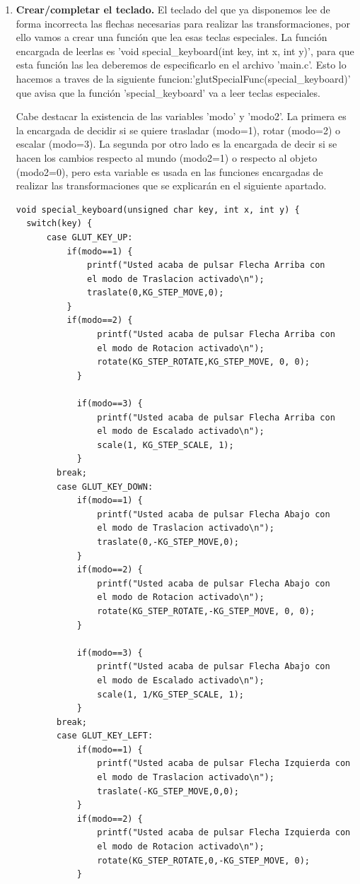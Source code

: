 \documentclass[12pt,a4paper]{article}
\begin{document}
\begin{enumerate}
\item \textbf{Crear/completar el teclado.}\newline
El teclado del que ya disponemos lee de forma incorrecta las flechas necesarias para realizar las transformaciones, por ello vamos a crear una función que lea esas teclas especiales. La función encargada de leerlas es 'void special\_keyboard(int key, int x, int y)', para que esta función las lea deberemos de especificarlo en el archivo 'main.c'. Esto lo hacemos a traves de la siguiente funcion:'glutSpecialFunc(special\_keyboard)' que avisa que la función 'special\_keyboard' va a leer teclas especiales.\newline

Cabe destacar la existencia de las variables 'modo' y 'modo2'. La primera es la encargada de decidir si se quiere trasladar (modo=1), rotar (modo=2) o escalar (modo=3). La segunda por otro lado es la encargada de decir si se hacen los cambios respecto al mundo (modo2=1) o respecto al objeto (modo2=0), pero esta variable es usada en las funciones encargadas de realizar las transformaciones que se explicarán en el siguiente apartado.\newline
\begin{lstlisting}
void special_keyboard(unsigned char key, int x, int y) {
  switch(key) {
      case GLUT_KEY_UP:
          if(modo==1) {
              printf("Usted acaba de pulsar Flecha Arriba con 
              el modo de Traslacion activado\n");
              traslate(0,KG_STEP_MOVE,0);
          }
          if(modo==2) {
                printf("Usted acaba de pulsar Flecha Arriba con 
                el modo de Rotacion activado\n");
                rotate(KG_STEP_ROTATE,KG_STEP_MOVE, 0, 0);
            }
                
            if(modo==3) {
                printf("Usted acaba de pulsar Flecha Arriba con 
                el modo de Escalado activado\n");
                scale(1, KG_STEP_SCALE, 1);
            }     
        break;
        case GLUT_KEY_DOWN:
            if(modo==1) {
                printf("Usted acaba de pulsar Flecha Abajo con 
                el modo de Traslacion activado\n");
                traslate(0,-KG_STEP_MOVE,0);
            }
            if(modo==2) {
                printf("Usted acaba de pulsar Flecha Abajo con 
                el modo de Rotacion activado\n");
                rotate(KG_STEP_ROTATE,-KG_STEP_MOVE, 0, 0);
            }
                
            if(modo==3) {
                printf("Usted acaba de pulsar Flecha Abajo con 
                el modo de Escalado activado\n");
                scale(1, 1/KG_STEP_SCALE, 1);
            }     
        break;
        case GLUT_KEY_LEFT:
            if(modo==1) {
                printf("Usted acaba de pulsar Flecha Izquierda con 
                el modo de Traslacion activado\n");
                traslate(-KG_STEP_MOVE,0,0);
            }
            if(modo==2) {
                printf("Usted acaba de pulsar Flecha Izquierda con 
                el modo de Rotacion activado\n");
                rotate(KG_STEP_ROTATE,0,-KG_STEP_MOVE, 0);
            }
                

\end{lstlisting}
\end{enumerate}
\end{document}
